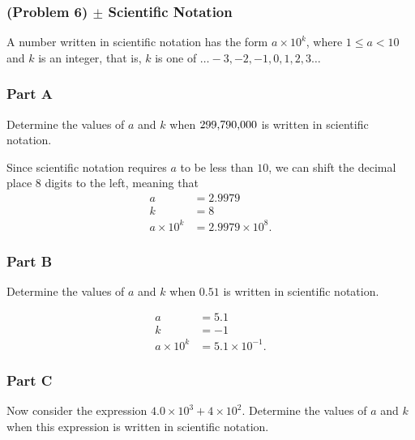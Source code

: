 \newpage

\subsubsection{(Problem 6) $\pm$ Scientific Notation}

A number written in scientific notation has the form $a \times 10^{k}$, where $1 \le a < 10$ and $k$ is an integer, that is, $k$ is one of $\ldots -3, -2, -1, 0, 1, 2, 3 \ldots$

\subsubsection{Part A}
Determine the values of $a$ and $k$ when $299{\small,}790{\small,}000$ is written in scientific notation.

\vspace{1em}

\begin{solution}
	Since scientific notation requires $a$ to be less than $10$, we can shift the decimal place $8$ digits to the left, meaning that
	\begin{align*}
		a &= 2.9979 \\
		k &= 8 \\
		a \times 10^{k} &= 2.9979 \times 10^{8}
		.\end{align*}
\end{solution}

\subsubsection{Part B}
Determine the values of $a$ and $k$ when $0.51$ is written in scientific notation.

\vspace{1em}

\begin{solution}
	\begin{align*}
		a &= 5.1 \\
		k &= -1 \\
		a \times 10^{k} &= 5.1 \times 10^{-1}
		.\end{align*}
\end{solution}

\subsubsection{Part C}
Now consider the expression $4.0 \times 10^{3} + 4 \times 10^2$. Determine the values of $a$ and $k$ when this expression is written in scientific notation.

